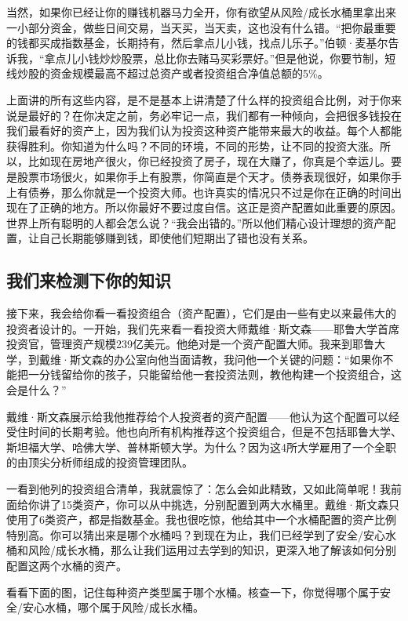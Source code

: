 当然，如果你已经让你的赚钱机器马力全开，你有欲望从风险/成长水桶里拿出来一小部分资金，做些日间交易，当天买，当天卖，这也没有什么错。“把你最重要的钱都买成指数基金，长期持有，然后拿点儿小钱，找点儿乐子。”伯顿·麦基尔告诉我，“拿点儿小钱炒炒股票，总比你去赌马买彩票好。”但是他说，你要节制，短线炒股的资金规模最高不超过总资产或者投资组合净值总额的5\%。

上面讲的所有这些内容，是不是基本上讲清楚了什么样的投资组合比例，对于你来说是最好的？在你决定之前，务必牢记一点，我们都有一种倾向，会把很多钱投在我们最看好的资产上，因为我们认为投资这种资产能带来最大的收益。每个人都能获得胜利。你知道为什么吗？不同的环境，不同的形势，让不同的投资大涨。所以，比如现在房地产很火，你已经投资了房子，现在大赚了，你真是个幸运儿。要是股票市场很火，如果你手上有股票，你简直是个天才。债券表现很好，如果你手上有债券，那么你就是一个投资大师。也许真实的情况只不过是你在正确的时间出现在了正确的地方。所以你最好不要过度自信。这正是资产配置如此重要的原因。世界上所有聪明的人都会怎么说？“我会出错的。”所以他们精心设计理想的资产配置，让自己长期能够赚到钱，即使他们短期出了错也没有关系。

\subsection{我们来检测下你的知识}

接下来，我会给你看一看投资组合（资产配置），它们是由一些有史以来最伟大的投资者设计的。一开始，我们先来看一看投资大师戴维·斯文森——耶鲁大学首席投资官，管理资产规模239亿美元。他绝对是一个资产配置大师。我来到耶鲁大学，到戴维·斯文森的办公室向他当面请教，我问他一个关键的问题：“如果你不能把一分钱留给你的孩子，只能留给他一套投资法则，教他构建一个投资组合，这会是什么？”

戴维·斯文森展示给我他推荐给个人投资者的资产配置——他认为这个配置可以经受住时间的长期考验。他也向所有机构推荐这个投资组合，但是不包括耶鲁大学、斯坦福大学、哈佛大学、普林斯顿大学。为什么？因为这4所大学雇用了一个全职的由顶尖分析师组成的投资管理团队。

一看到他列的投资组合清单，我就震惊了：怎么会如此精致，又如此简单呢！我前面给你讲了15类资产，你可以从中挑选，分别配置到两大水桶里。戴维·斯文森只使用了6类资产，都是指数基金。我也很吃惊，他给其中一个水桶配置的资产比例特别高。你可以猜出来是哪个水桶吗？到现在为止，我们已经学到了安全/安心水桶和风险/成长水桶，那么让我们运用过去学到的知识，更深入地了解该如何分别配置这两个水桶的资产。

看看下面的图，记住每种资产类型属于哪个水桶。核查一下，你觉得哪个属于安全/安心水桶，哪个属于风险/成长水桶。

